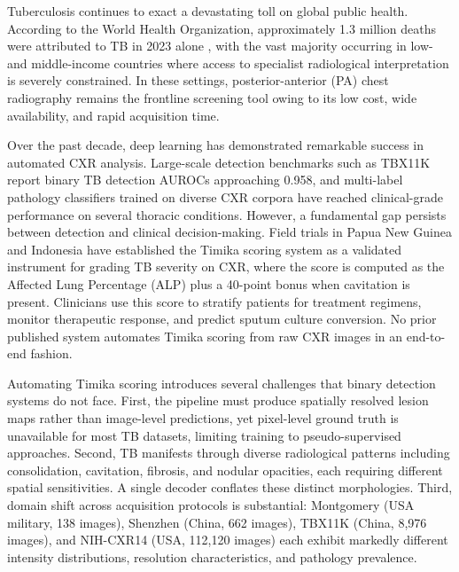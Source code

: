 \documentclass{article}
\begin{document}
Tuberculosis continues to exact a devastating toll on global public health. According to the World Health Organization, approximately 1.3 million deaths were attributed to TB in 2023 alone \cite{who2024tb}, with the vast majority occurring in low- and middle-income countries where access to specialist radiological interpretation is severely constrained. In these settings, posterior-anterior (PA) chest radiography remains the frontline screening tool owing to its low cost, wide availability, and rapid acquisition time.

Over the past decade, deep learning has demonstrated remarkable success in automated CXR analysis. Large-scale detection benchmarks such as TBX11K \cite{liu2020tbx11k} report binary TB detection AUROCs approaching 0.958, and multi-label pathology classifiers trained on diverse CXR corpora \cite{cohen2022torchxrayvision} have reached clinical-grade performance on several thoracic conditions. However, a fundamental gap persists between detection and clinical decision-making. Field trials in Papua New Guinea and Indonesia have established the Timika scoring system \cite{ralph2013timika} as a validated instrument for grading TB severity on CXR, where the score is computed as the Affected Lung Percentage (ALP) plus a 40-point bonus when cavitation is present. Clinicians use this score to stratify patients for treatment regimens, monitor therapeutic response, and predict sputum culture conversion. No prior published system automates Timika scoring from raw CXR images in an end-to-end fashion.

Automating Timika scoring introduces several challenges that binary detection systems do not face. First, the pipeline must produce spatially resolved lesion maps rather than image-level predictions, yet pixel-level ground truth is unavailable for most TB datasets, limiting training to pseudo-supervised approaches. Second, TB manifests through diverse radiological patterns including consolidation, cavitation, fibrosis, and nodular opacities, each requiring different spatial sensitivities. A single decoder conflates these distinct morphologies. Third, domain shift across acquisition protocols is substantial: Montgomery \cite{jaeger2014shenzhen} (USA military, 138 images), Shenzhen \cite{jaeger2014shenzhen} (China, 662 images), TBX11K \cite{liu2020tbx11k} (China, 8,976 images), and NIH-CXR14 \cite{wang2017nihcxr} (USA, 112,120 images) each exhibit markedly different intensity distributions, resolution characteristics, and pathology prevalence.
\end{document}
